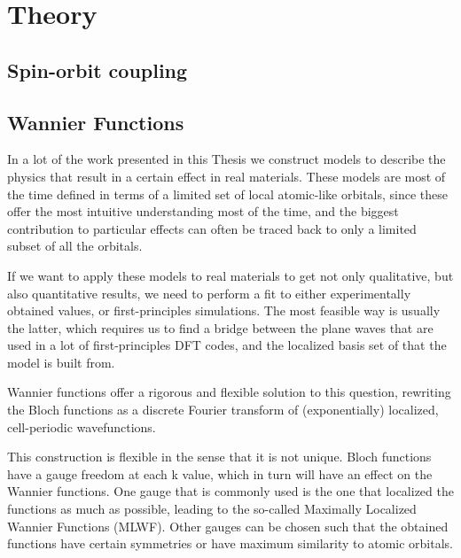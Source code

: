 \chapter{Theory}
\section{Spin-orbit coupling}
\section{Wannier Functions}

In a lot of the work presented in this Thesis we construct models to describe the physics that result in a certain effect in real materials.
These models are most of the time defined in terms of a limited set of local atomic-like orbitals, since these offer the most intuitive understanding most of the time, and the biggest contribution to particular effects can often be traced back to only a limited subset of all the orbitals.

If we want to apply these models to real materials to get not only qualitative, but also quantitative results, we need to perform a fit to either experimentally obtained values, or first-principles simulations.
The most feasible way is usually the latter, which requires us to find a bridge between the plane waves that are used in a lot of first-principles DFT codes, and the localized basis set of that the model is built from.

Wannier functions offer a rigorous and flexible solution to this question, rewriting the Bloch functions as a discrete Fourier transform of (exponentially) localized, cell-periodic wavefunctions.

This construction is flexible in the sense that it is not unique. Bloch functions have a gauge freedom at each k value, which in turn will have an effect on the Wannier functions.
One gauge that is commonly used is the one that localized the functions as much as possible, leading to the so-called Maximally Localized Wannier Functions (MLWF).
Other gauges can be chosen such that the obtained functions have certain symmetries or have maximum similarity to atomic orbitals.


